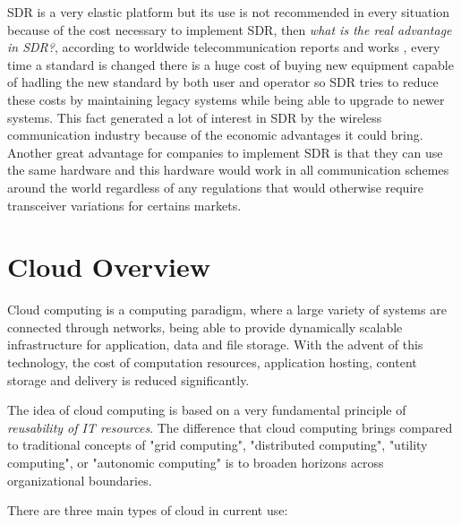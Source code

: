 SDR is a very elastic platform but its use is not recommended in every situation
because of the cost necessary to implement SDR, then \emph{what is the real
advantage in SDR?}, according to worldwide telecommunication reports and works
\cite{introlte}, every time a standard is changed there is a huge cost of buying
new equipment capable of hadling the new standard by both user and operator so
SDR tries to reduce these costs by maintaining legacy systems while being able
to upgrade to newer systems\cite{dayananda2012}. This fact generated a lot of
interest in SDR by the wireless communication industry because of the economic
advantages it could bring. Another great advantage for companies to implement
SDR is that they can use the same hardware and this hardware would work in all
communication schemes around the world regardless of any regulations that would
otherwise require transceiver variations for certains markets.


\section{Cloud Overview}
\label{sec:sdr_cloud}

Cloud computing is a computing paradigm, where a large variety of systems are
connected through networks, being able to provide dynamically scalable
infrastructure for application, data and file storage. With the advent of this
technology, the cost of computation resources, application hosting, content
storage and delivery is reduced significantly.


The idea of cloud computing is based on a very fundamental principle of
\emph{reusability of IT resources}. The difference that cloud computing brings
compared to traditional concepts of "grid computing", "distributed computing",
"utility computing", or "autonomic computing" is to broaden horizons across
organizational boundaries.

There are three main types of cloud in current use:

